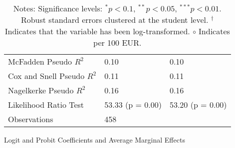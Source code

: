 \begin{table}
\begin{tabular}{lllllllll}
\midrule
McFadden Pseudo $R^2$ & \multicolumn{4}{l}{0.10} & \multicolumn{4}{l}{0.10} \\
Cox and Snell Pseudo $R^2$ & \multicolumn{4}{l}{0.11} & \multicolumn{4}{l}{0.11} \\
Nagelkerke Pseudo $R^2$ & \multicolumn{4}{l}{0.16} & \multicolumn{4}{l}{0.16} \\
Likelihood Ratio Test & \multicolumn{4}{l}{53.33 (p = 0.00)} & \multicolumn{4}{l}{53.20 (p = 0.00)} \\
Observations & \multicolumn{8}{l}{458} \\
\bottomrule
\end{tabular}
\caption*{Logit and Probit Coefficients and Average Marginal Effects}
\label{tab:logit_probit_results}
\caption*{\small{Notes: Significance levels: $^{{*}} p < 0.1$, $^{{**}} p < 0.05$, $^{{***}} p < 0.01$. Robust standard errors clustered at the student level. $^\dagger$ Indicates that the variable has been log-transformed. $\circ$ Indicates per 100 EUR.}}
\end{table}
